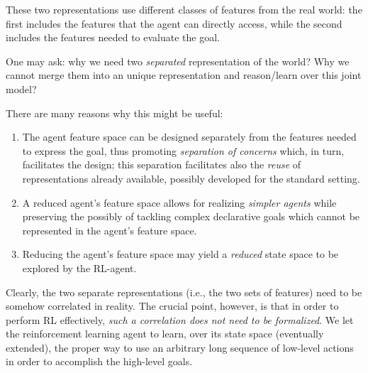 These two representations use different classes of features
from the real world: the first includes the features that the
agent can directly access, while the second includes the features needed to evaluate the \LLf goal.

One may ask: why we need two \emph{separated} representation of the world? Why we cannot merge them into an unique representation and reason/learn over this joint model?

There are many reasons why this might be useful:
\begin{enumerate}
	\item The agent feature space can be designed separately from
	the features needed to express the goal, thus promoting
	\emph{separation of concerns} which, in turn, facilitates the design; this separation facilitates also the \emph{reuse} of representations already available, possibly developed for the standard setting.\label{motivation:separation-of-concern}
	
	\item A reduced agent's feature space allows for realizing \emph{simpler agents} while preserving the possibly of tackling complex declarative goals which cannot be represented in the agent's feature space. \label{motivation:simpler-agent}
	
	\item Reducing the agent's feature space may yield a \emph{reduced} state space to be explored by the RL-agent.\label{motivation:reduced-space}
	
\end{enumerate}

Clearly, the two separate representations (i.e., the two sets
of features) need to be somehow correlated in reality. The
crucial point, however, is that in order to perform RL effectively, \emph{such a correlation does not need to be formalized}. We let the reinforcement learning agent to learn, over its state space (eventually extended), the proper way to use an arbitrary long sequence of low-level actions in order to accomplish the high-level goals.

